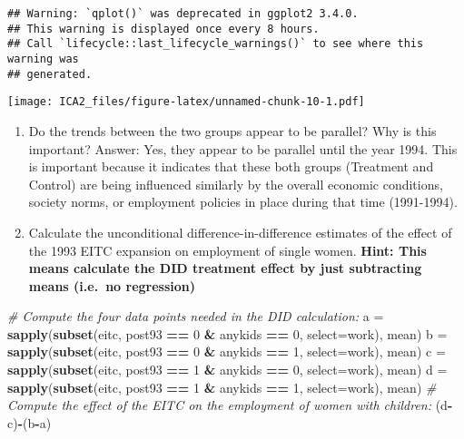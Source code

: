 \documentclass[
]{article}
\newenvironment{Shaded}{\begin{snugshade}}{\end{snugshade}}
\newcommand{\AttributeTok}[1]{\textcolor[rgb]{0.13,0.29,0.53}{#1}}
\newcommand{\CommentTok}[1]{\textcolor[rgb]{0.56,0.35,0.01}{\textit{#1}}}
\newcommand{\DecValTok}[1]{\textcolor[rgb]{0.00,0.00,0.81}{#1}}
\newcommand{\FunctionTok}[1]{\textcolor[rgb]{0.13,0.29,0.53}{\textbf{#1}}}
\newcommand{\NormalTok}[1]{#1}
\newcommand{\OtherTok}[1]{\textcolor[rgb]{0.56,0.35,0.01}{#1}}
\newcommand{\SpecialCharTok}[1]{\textcolor[rgb]{0.81,0.36,0.00}{\textbf{#1}}}
\begin{document}
\begin{verbatim}
## Warning: `qplot()` was deprecated in ggplot2 3.4.0.
## This warning is displayed once every 8 hours.
## Call `lifecycle::last_lifecycle_warnings()` to see where this warning was
## generated.
\end{verbatim}

\texttt{[image: ICA2\_files/figure-latex/unnamed-chunk-10-1.pdf]}

\begin{enumerate}
\def\labelenumi{\arabic{enumi}.}
\setcounter{enumi}{4}
\item
  Do the trends between the two groups appear to be parallel? Why is
  this important? Answer: Yes, they appear to be parallel until the year
  1994. This is important because it indicates that these both groups
  (Treatment and Control) are being influenced similarly by the overall
  economic conditions, society norms, or employment policies in place
  during that time (1991-1994).
\item
  Calculate the unconditional difference-in-difference estimates of the
  effect of the 1993 EITC expansion on employment of single women.
  \textbf{Hint: This means calculate the DID treatment effect by just
  subtracting means (i.e.~no regression)}
\end{enumerate}

\begin{Shaded}
\begin{Highlighting}[]
\CommentTok{\# Compute the four data points needed in the DID calculation:}
\NormalTok{a }\OtherTok{=} \FunctionTok{sapply}\NormalTok{(}\FunctionTok{subset}\NormalTok{(eitc, post93 }\SpecialCharTok{==} \DecValTok{0} \SpecialCharTok{\&}\NormalTok{ anykids }\SpecialCharTok{==} \DecValTok{0}\NormalTok{, }\AttributeTok{select=}\NormalTok{work), mean)}
\NormalTok{b }\OtherTok{=} \FunctionTok{sapply}\NormalTok{(}\FunctionTok{subset}\NormalTok{(eitc, post93 }\SpecialCharTok{==} \DecValTok{0} \SpecialCharTok{\&}\NormalTok{ anykids }\SpecialCharTok{==} \DecValTok{1}\NormalTok{, }\AttributeTok{select=}\NormalTok{work), mean)}
\NormalTok{c }\OtherTok{=} \FunctionTok{sapply}\NormalTok{(}\FunctionTok{subset}\NormalTok{(eitc, post93 }\SpecialCharTok{==} \DecValTok{1} \SpecialCharTok{\&}\NormalTok{ anykids }\SpecialCharTok{==} \DecValTok{0}\NormalTok{, }\AttributeTok{select=}\NormalTok{work), mean)}
\NormalTok{d }\OtherTok{=} \FunctionTok{sapply}\NormalTok{(}\FunctionTok{subset}\NormalTok{(eitc, post93 }\SpecialCharTok{==} \DecValTok{1} \SpecialCharTok{\&}\NormalTok{ anykids }\SpecialCharTok{==} \DecValTok{1}\NormalTok{, }\AttributeTok{select=}\NormalTok{work), mean)}
\CommentTok{\# Compute the effect of the EITC on the employment of women with children:}
\NormalTok{(d}\SpecialCharTok{{-}}\NormalTok{c)}\SpecialCharTok{{-}}\NormalTok{(b}\SpecialCharTok{{-}}\NormalTok{a)}
\end{Highlighting}
\end{Shaded}
\end{document}

